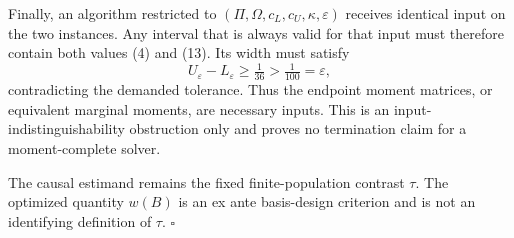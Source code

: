 Finally, an algorithm restricted to \((\Pi,\Omega,c_L,c_U,\kappa,\varepsilon)\) receives identical input on the two instances. Any interval that is always valid for that input must therefore contain both values (4) and (13). Its width must satisfy
\[
U_\varepsilon-L_\varepsilon\ge\tfrac1{36}>\tfrac1{100}=\varepsilon,
\]
contradicting the demanded tolerance. Thus the endpoint moment matrices, or equivalent marginal moments, are necessary inputs. This is an input-indistinguishability obstruction only and proves no termination claim for a moment-complete solver.

The causal estimand remains the fixed finite-population contrast \(\tau\). The optimized quantity \(w(B)\) is an ex ante basis-design criterion and is not an identifying definition of \(\tau\). \(\square\)